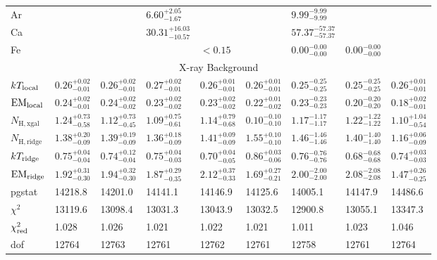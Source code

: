 \begin{tabular}{@{}lllllllll@{}}
Ar &      &      & ${6.60}^{+2.05}_{-1.67}$ &      &      & ${9.99}^{-9.99}_{-9.99}$ &      &      \\ [0.5 em]
Ca &      &      & ${30.31}^{+16.03}_{-10.57}$ &      &      & ${57.37}^{-57.37}_{-57.37}$ &      &      \\ [0.5 em]
Fe &      &      &      & $< 0.15$ &      & ${0.00}^{-0.00}_{-0.00}$ & ${0.00}^{-0.00}_{-0.00}$ &      \\
\midrule
\multicolumn{9}{c}{X-ray Background} \\
\midrule
$k T_{\mathrm{local}}$ & ${0.26}^{+0.02}_{-0.01}$ & ${0.26}^{+0.02}_{-0.01}$ & ${0.27}^{+0.02}_{-0.01}$ & ${0.26}^{+0.01}_{-0.01}$ & ${0.26}^{+0.01}_{-0.01}$ & ${0.25}^{-0.25}_{-0.25}$ & ${0.25}^{-0.25}_{-0.25}$ & ${0.26}^{+0.01}_{-0.01}$ \\ [0.5 em]
$\mathrm{EM}_{\mathrm{local}}$ & ${0.24}^{+0.02}_{-0.01}$ & ${0.24}^{+0.02}_{-0.02}$ & ${0.23}^{+0.02}_{-0.02}$ & ${0.23}^{+0.02}_{-0.02}$ & ${0.22}^{+0.01}_{-0.02}$ & ${0.23}^{-0.23}_{-0.23}$ & ${0.20}^{-0.20}_{-0.20}$ & ${0.18}^{+0.02}_{-0.01}$ \\ [0.5 em]
$N_{\mathrm{H,xgal}}$ & ${1.24}^{+0.73}_{-0.58}$ & ${1.12}^{+0.73}_{-0.45}$ & ${1.09}^{+0.75}_{-0.61}$ & ${1.14}^{+0.79}_{-0.68}$ & ${0.10}^{-0.10}_{-0.10}$ & ${1.17}^{-1.17}_{-1.17}$ & ${1.22}^{-1.22}_{-1.22}$ & ${1.10}^{+1.04}_{-0.54}$ \\ [0.5 em]
$N_{\mathrm{H,ridge}}$ & ${1.38}^{+0.20}_{-0.09}$ & ${1.39}^{+0.19}_{-0.09}$ & ${1.36}^{+0.18}_{-0.09}$ & ${1.41}^{+0.09}_{-0.09}$ & ${1.55}^{+0.10}_{-0.10}$ & ${1.46}^{-1.46}_{-1.46}$ & ${1.40}^{-1.40}_{-1.40}$ & ${1.16}^{+0.06}_{-0.09}$ \\ [0.5 em]
$k T_{\mathrm{ridge}}$ & ${0.75}^{+0.04}_{-0.04}$ & ${0.74}^{+0.12}_{-0.04}$ & ${0.75}^{+0.04}_{-0.03}$ & ${0.70}^{+0.04}_{-0.05}$ & ${0.86}^{+0.03}_{-0.06}$ & ${0.76}^{-0.76}_{-0.76}$ & ${0.68}^{-0.68}_{-0.68}$ & ${0.74}^{+0.03}_{-0.03}$ \\ [0.5 em]
$\mathrm{EM}_{\mathrm{ridge}}$ & ${1.92}^{+0.31}_{-0.30}$ & ${1.94}^{+0.32}_{-0.30}$ & ${1.87}^{+0.29}_{-0.35}$ & ${2.12}^{+0.37}_{-0.33}$ & ${1.69}^{+0.27}_{-0.21}$ & ${2.00}^{-2.00}_{-2.00}$ & ${2.08}^{-2.08}_{-2.08}$ & ${1.47}^{+0.26}_{-0.25}$ \\
\midrule
pgstat & 14218.8 & 14201.0 & 14141.1 & 14146.9 & 14125.6 & 14005.1 & 14147.9 & 14486.6 \\
$\chi^2$ & 13119.6 & 13098.4 & 13031.3 & 13043.9 & 13032.5 & 12900.8 & 13055.1 & 13347.3 \\
$\chi^2_{\mathrm{red}}$ & 1.028 & 1.026 & 1.021 & 1.022 & 1.021 & 1.011 & 1.023 & 1.046 \\
dof & 12764 & 12763 & 12761 & 12762 & 12761 & 12758 & 12761 & 12764 \\
\bottomrule
\end{tabular}
